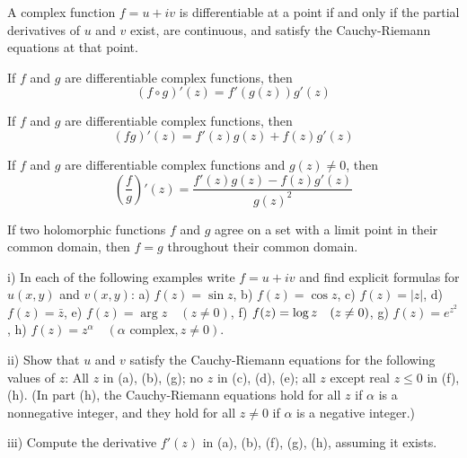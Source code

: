 \begin{theorem}
A complex function $f = u + iv$ is differentiable at a point if and only if the partial derivatives of $u$ and $v$ exist, are continuous, and satisfy the Cauchy-Riemann equations at that point.
\end{theorem}

\begin{theorem}
If $f$ and $g$ are differentiable complex functions, then
\[ (f \circ g)'(z) = f'(g(z))g'(z) \]
\end{theorem}

\begin{theorem}
If $f$ and $g$ are differentiable complex functions, then
\[ (fg)'(z) = f'(z)g(z) + f(z)g'(z) \]
\end{theorem}

\begin{theorem}
If $f$ and $g$ are differentiable complex functions and $g(z) \neq 0$, then
\[ \left(\frac{f}{g}\right)'(z) = \frac{f'(z)g(z) - f(z)g'(z)}{g(z)^2} \]
\end{theorem}

\begin{theorem}
If two holomorphic functions $f$ and $g$ agree on a set with a limit point in their common domain, then $f = g$ throughout their common domain.
\end{theorem}

\begin{problembox}
i) In each of the following examples write \( f = u + iv \) and find explicit formulas for \( u(x, y) \) and \( v(x, y) \):
a) \( f(z) = \sin z \), b) \( f(z) = \cos z \),
c) \( f(z) = |z| \), d) \( f(z) = \bar{z} \),
e) \( f(z) = \arg z \quad (z \neq 0) \), f) \( f(z) = \log z \quad (z \neq 0) \),
g) \( f(z) = e^{z^2} \), h) \( f(z) = z^\alpha \quad (\alpha \text{ complex}, z \neq 0) \).

ii) Show that \( u \) and \( v \) satisfy the Cauchy-Riemann equations for the following values of \( z \): All \( z \) in (a), (b), (g); no \( z \) in (c), (d), (e); all \( z \) except real \( z \leq 0 \) in (f), (h). (In part (h), the Cauchy-Riemann equations hold for all \( z \) if \( \alpha \) is a nonnegative integer, and they hold for all \( z \neq 0 \) if \( \alpha \) is a negative integer.)

iii) Compute the derivative \( f'(z) \) in (a), (b), (f), (g), (h), assuming it exists.
\end{problembox}

